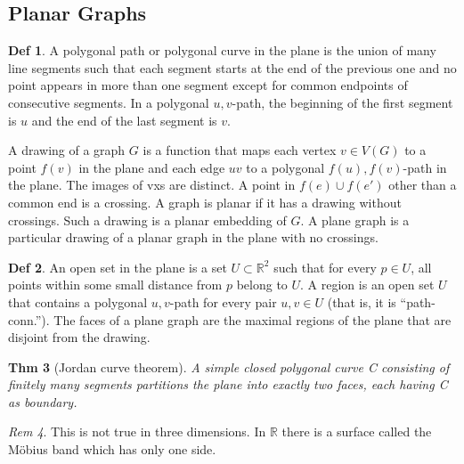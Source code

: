 \documentclass[11pt, fleqn, a4paper, landscape]{article}
\theoremstyle{plain} %
\newtheorem{thm}{Thm}
\theoremstyle{remark} %
\newtheorem{rem}[thm]{Rem}
\theoremstyle{definition} %
\newtheorem{defi}[thm]{Def}
\begin{document}
\begin{multicols}{5}
\section{Planar Graphs}
\begin{defi}
A polygonal path or polygonal curve in the plane is the union of many line segments such that each segment starts at the end of the previous one and no point appears in more than one segment except for common endpoints of consecutive segments. In a polygonal $u, v$-path, the beginning of the first segment is $u$ and the end of the last segment is $v$.

A drawing of a graph $G$ is a function that maps each vertex $v\in V (G)$ to a point $f(v)$ in the plane and each edge $uv$ to a polygonal $f(u), f(v)$-path in the plane. The images of vxs are distinct.
A point in $f(e)\cup f(e')$ other than a common end is a crossing. A graph is planar if it has a drawing without crossings. Such a drawing is a planar embedding of $G$. A plane graph is a particular drawing of a planar graph in the plane with no crossings.
\end{defi}
\addtocounter{thm}{1}
\addtocounter{thm}{1}

\begin{defi}
An open set in the plane is a set $U \subset \mathbb{R}^2$ such that for every $p\in U$, all points within some small distance from $p$ belong to $U$. A region is an open set $U$ that contains a polygonal $u, v$-path for every pair $u, v \in U$ (that is, it is “path-conn.”). The faces of a plane graph are the maximal regions of the plane that are disjoint from the drawing.
\end{defi}

\begin{thm}[Jordan curve theorem]
A simple closed polygonal curve C consisting of finitely
many segments partitions the plane into exactly two faces, each having C as boundary.
\end{thm}

\begin{rem}
This is not true in three dimensions. In $\mathbb{R}$ there is a surface called the Möbius band which has only one side.
\end{rem}


\end{multicols}
\end{document}
